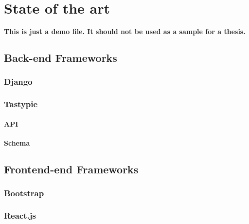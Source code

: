 \chapter{State of the art}
\label{chapter:state}

\textbf{This is just a demo file. It should not be used as a sample for a thesis.}\\

\section{Back-end Frameworks}
\label{sec:backend}

\subsection{Django}
\label{sub-sec:django}



\subsection{Tastypie}
\label{sub-sec:tastypie}

\subsubsection{API}


\subsubsection{Schema}



\section{Frontend-end Frameworks}
\label{sec:frontend}

\subsection{Bootstrap}
\label{sub-sec:bootstrap}


\subsection{React.js}
\label{sub-sec:react}

